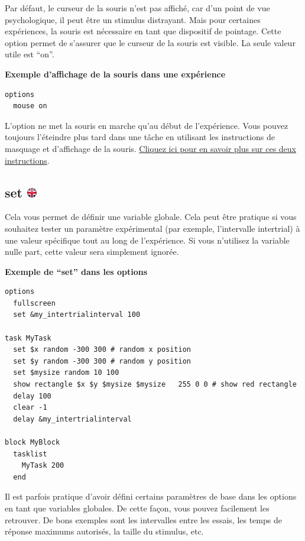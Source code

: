 \documentclass[
]{book}
\begin{document}
Par défaut, le curseur de la souris n'est pas affiché, car d'un point de
vue psychologique, il peut être un stimulus distrayant. Mais pour
certaines expériences, la souris est nécessaire en tant que dispositif
de pointage. Cette option permet de s'assurer que le curseur de la
souris est visible. La seule valeur utile est ``on''.

\textbf{Exemple d'affichage de la souris dans une expérience}

\begin{verbatim}
options
  mouse on
\end{verbatim}

L'option ne met la souris en marche qu'au début de l'expérience. Vous
pouvez toujours l'éteindre plus tard dans une tâche en utilisant les
instructions de masquage et d'affichage de la souris.
\protect\hyperlink{task-mouse}{Cliquez ici pour en savoir plus sur ces
deux instructions}.

\hypertarget{set}{%
\subsection[set ]{\texorpdfstring{set
\href{https://www.psytoolkit.org/doc3.2.0/syntax.html\#options-set}{\protect\includegraphics{img/ukflag.png}}}{set }}\label{set}}

Cela vous permet de définir une variable globale. Cela peut être
pratique si vous souhaitez tester un paramètre expérimental (par
exemple, l'intervalle intertrial) à une valeur spécifique tout au long
de l'expérience. Si vous n'utilisez la variable nulle part, cette valeur
sera simplement ignorée.

\textbf{Exemple de ``set'' dans les options}

\begin{verbatim}
options
  fullscreen
  set &my_intertrialinterval 100

task MyTask
  set $x random -300 300 # random x position
  set $y random -300 300 # random y position
  set $mysize random 10 100
  show rectangle $x $y $mysize $mysize   255 0 0 # show red rectangle
  delay 100
  clear -1
  delay &my_intertrialinterval

block MyBlock
  tasklist
    MyTask 200
  end
\end{verbatim}

Il est parfois pratique d'avoir défini certains paramètres de base dans
les options en tant que variables globales. De cette façon, vous pouvez
facilement les retrouver. De bons exemples sont les intervalles entre
les essais, les temps de réponse maximums autorisés, la taille du
stimulus, etc.
\end{document}
